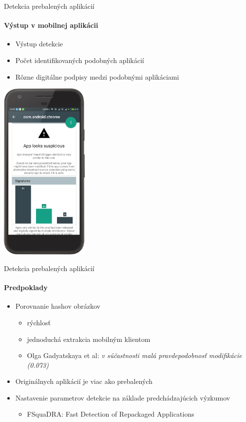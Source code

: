 \documentclass{beamer}
\begin{document}
   \begin{frame}[label=lists]{Detekcia prebalených aplikácií}
 	 \framesubtitle{Výstup v mobilnej aplikácii}
	\begin{minipage}[htb]{\textwidth}
		\begin{minipage}[t]{0.5\textwidth}
			\hbox{}
			\hbox{}
			\hbox{}
			\begin{itemize}
				\item Výstup detekcie
				\item Počet identifikovaných podobných aplikácií
				\item Rôzne digitálne podpisy medzi podobnými aplikáciami
			\end{itemize}
     		\vfill
		\end{minipage}%
	\hfill
	\centering
		\begin{minipage}[t][][b]{0.4\textwidth}
		\centering
		\includegraphics[height=9cm]{images/app/detection_device_1.png}
		\label{fig:app-detail}
		\end{minipage}%
	\end{minipage}
  \end{frame} 
  
 \begin{frame}[label=lists]{Detekcia prebalených aplikácií}
 	 \framesubtitle{Predpoklady}
		\begin{itemize}
			\item Porovnanie hashov obrázkov
			\begin{itemize}
				\item rýchlosť
				\item jednoduchá extrakcia mobilným klientom
				\item  Olga Gadyatskaya et al: \textit{v súčastnosti malá pravdepodobnosť modifikácie (0.073)} \cite{a}
			\end{itemize}
			\item Originálnych aplikácií je viac ako prebalených
			\item Nastavenie parametrov detekcie na základe predchádzajúcich výzkumov
				\begin{itemize}
					\item FSquaDRA: Fast Detection of Repackaged Applications
				\end{itemize}
		\end{itemize}
  \end{frame}     
  
\end{document}
